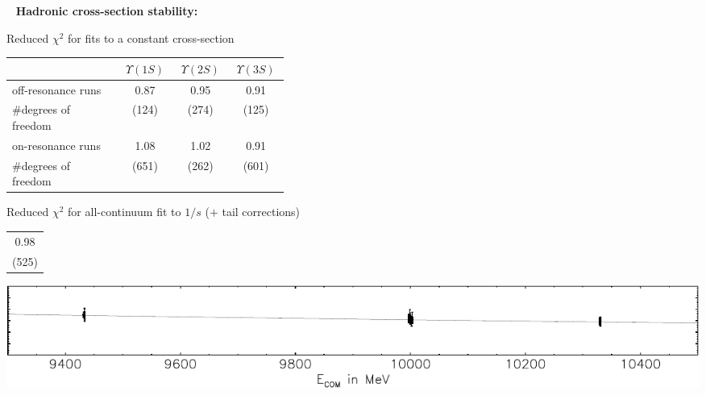\documentclass[landscape]{article}
\newenvironment{slide}{\mbox{ }\vfill}{\vfill \mbox{ } \pagebreak}
\begin{document}


\begin{slide}
{\bf Hadronic cross-section stability:}

\vfill
Reduced $\chi^2$ for fits to a constant cross-section

\vfill \renewcommand{\arraystretch}{1.25}
\begin{center}
  \begin{tabular}{p{0.4\linewidth} c c c}
    & $\Upsilon(1S)$ & $\Upsilon(2S)$ & $\Upsilon(3S)$ \\\hline
    off-resonance runs & 0.87 & 0.95 & 0.91 \\
    \#degrees of freedom & (124) & (274) & (125) \\\hline
    on-resonance runs & 1.08 & 1.02 & 0.91 \\
    \#degrees of freedom & (651) & (262) & (601)
  \end{tabular}
\end{center}

\vfill
Reduced $\chi^2$ for all-continuum fit to $1/s$ ($+$ tail corrections)
\mbox{\hspace{1.4 cm}}
\begin{tabular}{c}
  \\
  0.98 \\
  (525)
\end{tabular}

\vfill
\includegraphics[width=\linewidth]{oneovers}
\end{slide}
\end{document}

